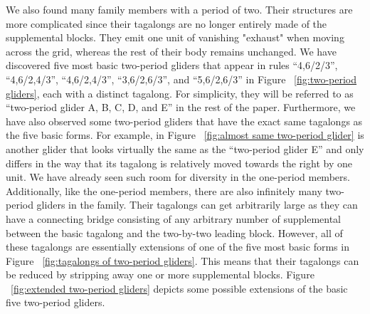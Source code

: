 \documentclass[12pt]{article}
\numberwithin{figure}{section} %
\begin{document}
We also found many family members with a period of two. Their structures are more complicated since their tagalongs are no longer entirely made of the supplemental blocks. They emit one unit of vanishing "exhaust" when moving across the grid, whereas the rest of their body remains unchanged. We have discovered five most basic two-period gliders that appear in rules “4,6/2/3”, “4,6/2,4/3”, “4,6/2,4/3”, “3,6/2,6/3”, and “5,6/2,6/3” in Figure ~\ref{fig:two-period gliders}, each with a distinct tagalong. For simplicity, they will be referred to as “two-period glider A, B, C, D, and E” in the rest of the paper. Furthermore, we have also observed some two-period gliders that have the exact same tagalongs as the five basic forms. For example, in Figure ~\ref{fig:almost same two-period glider} is another glider that looks virtually the same as the “two-period glider E” and only differs in the way that its tagalong is relatively moved towards the right by one unit. We have already seen such room for diversity in the one-period members. Additionally, like the one-period members, there are also infinitely many two-period gliders in the family. Their tagalongs can get arbitrarily large as they can have a connecting bridge consisting of any arbitrary number of supplemental between the basic tagalong and the two-by-two leading block. However, all of these tagalongs are essentially extensions of one of the five most basic forms in Figure ~\ref{fig:tagalongs of two-period gliders}. This means that their tagalongs can be reduced by stripping away one or more supplemental blocks. Figure ~\ref{fig:extended two-period gliders} depicts some possible extensions of the basic five two-period gliders. 
\end{document}
